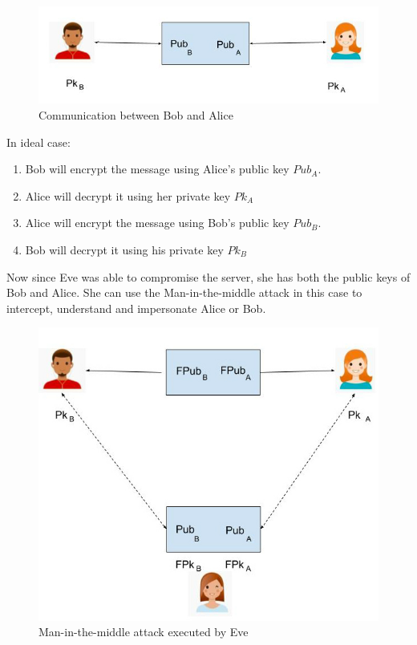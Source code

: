 \documentclass{article}
\begin{document}
\begin{figure}[h]
\centering
\includegraphics[scale=0.5]{3a.jpg}
\caption{Communication between Bob and Alice}
\label{fig:bob_alice}
\end{figure}

In ideal case:
\begin{enumerate}

\item Bob will encrypt the message using Alice's public key $Pub_A$.
\item Alice will decrypt it using her private key $Pk_A$
\item Alice will encrypt the message using Bob's public key $Pub_B$.
\item Bob will decrypt it using his private key $Pk_B$

\end{enumerate}

\newpage Now since Eve was able to compromise the server, she has both the public keys of Bob and Alice. She can use the Man-in-the-middle attack in this case to intercept, understand and impersonate Alice or Bob.


\begin{figure}[h]
\centering
\includegraphics[scale=0.5]{3b.jpg}
\caption{Man-in-the-middle attack executed by Eve}
\label{fig:eve_here}
\end{figure}
\end{document}
